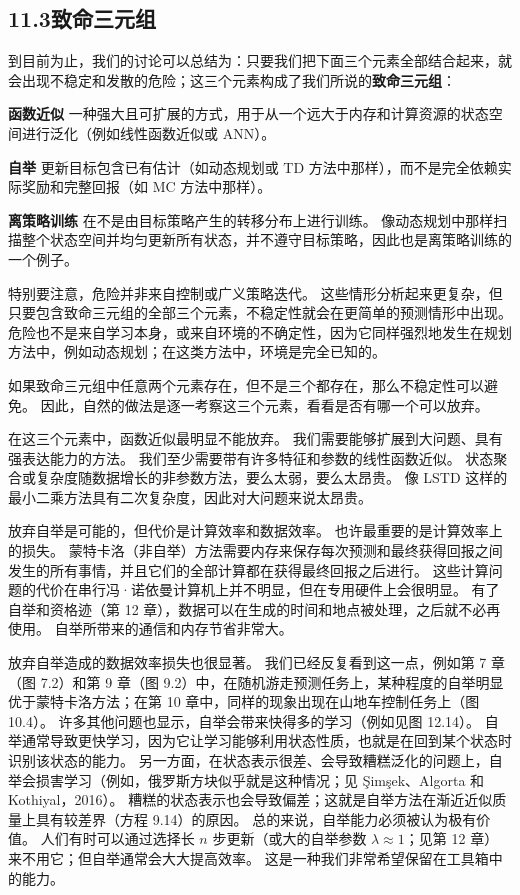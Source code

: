 \documentclass[UTF8, 12pt, fontset=fandol, oneside]{ctexart}
\begin{document}
\subsection*{11.3\quad 致命三元组}

到目前为止，我们的讨论可以总结为：只要我们把下面三个元素全部结合起来，就会出现不稳定和发散的危险；这三个元素构成了我们所说的\textbf{致命三元组}：

\noindent\textbf{函数近似}
一种强大且可扩展的方式，用于从一个远大于内存和计算资源的状态空间进行泛化（例如线性函数近似或 ANN）。

\noindent\textbf{自举}
更新目标包含已有估计（如动态规划或 TD 方法中那样），而不是完全依赖实际奖励和完整回报（如 MC 方法中那样）。

\noindent\textbf{离策略训练}
在不是由目标策略产生的转移分布上进行训练。
像动态规划中那样扫描整个状态空间并均匀更新所有状态，并不遵守目标策略，因此也是离策略训练的一个例子。

特别要注意，危险并非来自控制或广义策略迭代。
这些情形分析起来更复杂，但只要包含致命三元组的全部三个元素，不稳定性就会在更简单的预测情形中出现。
危险也不是来自学习本身，或来自环境的不确定性，因为它同样强烈地发生在规划方法中，例如动态规划；在这类方法中，环境是完全已知的。

如果致命三元组中任意两个元素存在，但不是三个都存在，那么不稳定性可以避免。
因此，自然的做法是逐一考察这三个元素，看看是否有哪一个可以放弃。

在这三个元素中，函数近似最明显不能放弃。
我们需要能够扩展到大问题、具有强表达能力的方法。
我们至少需要带有许多特征和参数的线性函数近似。
状态聚合或复杂度随数据增长的非参数方法，要么太弱，要么太昂贵。
像 LSTD 这样的最小二乘方法具有二次复杂度，因此对大问题来说太昂贵。

放弃自举是可能的，但代价是计算效率和数据效率。
也许最重要的是计算效率上的损失。
蒙特卡洛（非自举）方法需要内存来保存每次预测和最终获得回报之间发生的所有事情，并且它们的全部计算都在获得最终回报之后进行。
这些计算问题的代价在串行冯·诺依曼计算机上并不明显，但在专用硬件上会很明显。
有了自举和资格迹（第 12 章），数据可以在生成的时间和地点被处理，之后就不必再使用。
自举所带来的通信和内存节省非常大。

放弃自举造成的数据效率损失也很显著。
我们已经反复看到这一点，例如第 7 章（图 7.2）和第 9 章（图 9.2）中，在随机游走预测任务上，某种程度的自举明显优于蒙特卡洛方法；在第 10 章中，同样的现象出现在山地车控制任务上（图 10.4）。
许多其他问题也显示，自举会带来快得多的学习（例如见图 12.14）。
自举通常导致更快学习，因为它让学习能够利用状态性质，也就是在回到某个状态时识别该状态的能力。
另一方面，在状态表示很差、会导致糟糕泛化的问题上，自举会损害学习（例如，俄罗斯方块似乎就是这种情况；见 Şimşek、Algorta 和 Kothiyal，2016）。
糟糕的状态表示也会导致偏差；这就是自举方法在渐近近似质量上具有较差界（方程 9.14）的原因。
总的来说，自举能力必须被认为极有价值。
人们有时可以通过选择长 $n$ 步更新（或大的自举参数 $\lambda\approx1$；见第 12 章）来不用它；但自举通常会大大提高效率。
这是一种我们非常希望保留在工具箱中的能力。
\end{document}
